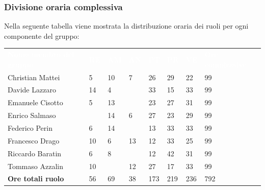 \subsubsection{Divisione oraria complessiva} 
Nella seguente tabella viene mostrata la distribuzione oraria dei ruoli per ogni componente del gruppo:
{
	\renewcommand{\arraystretch}{2}
	\centering
\begin{table}[h]
		\caption{Tabella della divisione oraria complessiva}
	\begin{longtable}{ C{5cm} C{1cm} C{1cm} C{1cm} C{1cm} C{1cm} C{1cm} C{3cm}}
		\textcolor{white}{\textbf{Nome membro del gruppo}} & \textcolor{white}{\textbf{RE}} & \textcolor{white}{\textbf{AM}} & \textcolor{white}{\textbf{AN}} & \textcolor{white}{\textbf{PT}} & \textcolor{white}{\textbf{PR}} & \textcolor{white}{\textbf{VE}} & \textcolor{white}{\textbf{Ore complessive}}\\	
        
        Christian Mattei & 5 & 10 & 7 & 26 & 29 & 22 & 99 \\
        Davide Lazzaro & 14 & 4 & & 33 & 15 & 33 & 99\\
        Emanuele Cisotto & 5 & 13 & & 23 & 27 & 31 & 99 \\
        Enrico Salmaso & & 14 & 6 & 27 & 23 & 29 & 99\\
        Federico Perin & 6 & 14 & & 13 & 33 & 33 & 99\\
        Francesco Drago & 10 & 6 & 13 & 12 & 33 & 25 & 99 \\
        Riccardo Baratin & 6 & 8 & & 12 & 42 & 31 & 99 \\
        Tommaso Azzalin & 10 & & 12 & 27 & 17 & 33 & 99 \\
        \textbf{Ore totali ruolo} & 56 & 69 & 38 & 173 & 219 & 236 &  792 \\

	\end{longtable}
\end{table}
}
